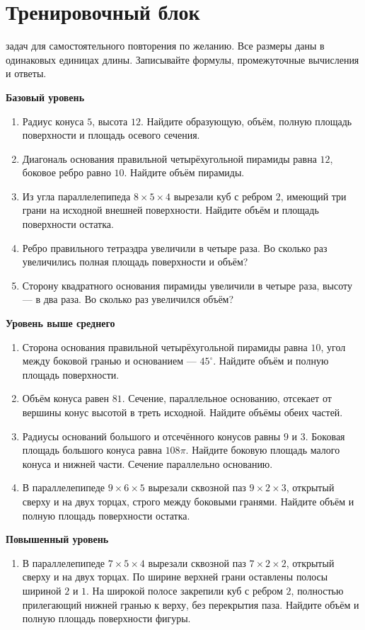 \documentclass[a4paper,12pt]{article}
\newcommand{\sub}[1]{\par\medskip\textcolor{darkaccent}{\textbf{#1}}\par\smallskip}
\begin{document}
\section*{Тренировочный блок}
 задач для самостоятельного повторения по желанию. Все размеры даны в одинаковых единицах длины. Записывайте формулы, промежуточные вычисления и ответы.
\sub{Базовый уровень}
\begin{enumerate}[itemsep=5pt]
\item Радиус конуса $5$, высота $12$. Найдите образующую, объём, полную площадь поверхности и площадь осевого сечения.
\item Диагональ основания правильной четырёхугольной пирамиды равна $12$, боковое ребро равно $10$. Найдите объём пирамиды.
\item Из угла параллелепипеда $8\times5\times4$ вырезали куб с ребром $2$, имеющий три грани на исходной внешней поверхности. Найдите объём и площадь поверхности остатка.
\item Ребро правильного тетраэдра увеличили в четыре раза. Во сколько раз увеличились полная площадь поверхности и объём?
\item Сторону квадратного основания пирамиды увеличили в четыре раза, высоту --- в два раза. Во сколько раз увеличился объём?
\end{enumerate}
\sub{Уровень выше среднего}
\begin{enumerate}[start=6,itemsep=5pt]
\item Сторона основания правильной четырёхугольной пирамиды равна $10$, угол между боковой гранью и основанием --- $45^\circ$. Найдите объём и полную площадь поверхности.
\item Объём конуса равен $81$. Сечение, параллельное основанию, отсекает от вершины конус высотой в треть исходной. Найдите объёмы обеих частей.
\item Радиусы оснований большого и отсечённого конусов равны $9$ и $3$. Боковая площадь большого конуса равна $108\pi$. Найдите боковую площадь малого конуса и нижней части. Сечение параллельно основанию.
\item В параллелепипеде $9\times6\times5$ вырезали сквозной паз $9\times2\times3$, открытый сверху и на двух торцах, строго между боковыми гранями. Найдите объём и полную площадь поверхности остатка.
\end{enumerate}
\sub{Повышенный уровень}
\begin{enumerate}[start=10]
\item В параллелепипеде $7\times5\times4$ вырезали сквозной паз $7\times2\times2$, открытый сверху и на двух торцах. По ширине верхней грани оставлены полосы шириной $2$ и $1$. На широкой полосе закрепили куб с ребром $2$, полностью прилегающий нижней гранью к верху, без перекрытия паза. Найдите объём и полную площадь поверхности фигуры.
\end{enumerate}
\clearpage
\end{document}
